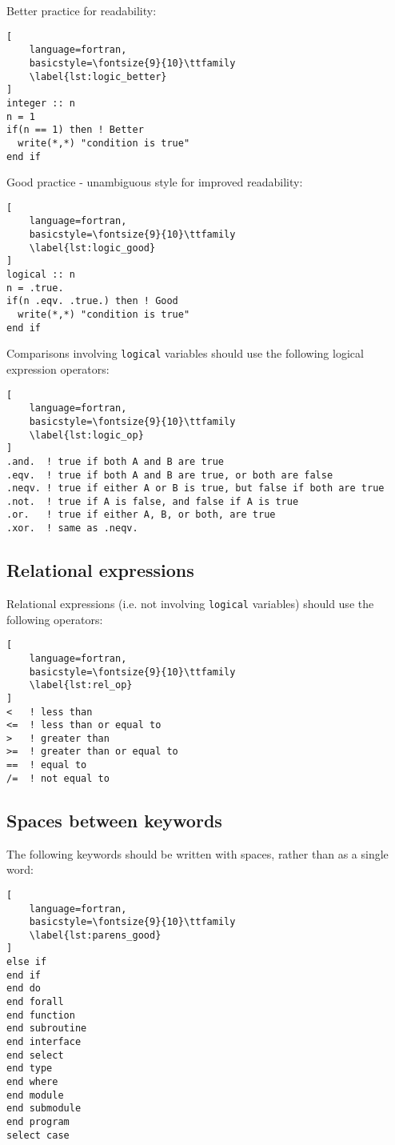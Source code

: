 \documentclass[11pt]{article}
\begin{document}
Better practice for readability:
\begin{lstlisting}[
	language=fortran,
    basicstyle=\fontsize{9}{10}\ttfamily
    \label{lst:logic_better}
]
integer :: n
n = 1
if(n == 1) then ! Better
  write(*,*) "condition is true"
end if
\end{lstlisting}

Good practice - unambiguous style for improved readability:

\begin{lstlisting}[
	language=fortran,
    basicstyle=\fontsize{9}{10}\ttfamily
    \label{lst:logic_good}
]
logical :: n
n = .true.
if(n .eqv. .true.) then ! Good
  write(*,*) "condition is true"
end if
\end{lstlisting}



Comparisons involving \texttt{logical} variables should use the 
following logical expression operators:
\begin{lstlisting}[
	language=fortran,
    basicstyle=\fontsize{9}{10}\ttfamily
    \label{lst:logic_op}
]
.and.  ! true if both A and B are true 
.eqv.  ! true if both A and B are true, or both are false
.neqv. ! true if either A or B is true, but false if both are true
.not.  ! true if A is false, and false if A is true
.or.   ! true if either A, B, or both, are true
.xor.  ! same as .neqv. 
\end{lstlisting}

\subsection{Relational expressions}
Relational expressions (i.e. not involving \texttt{logical} variables) should use the following operators:
\begin{lstlisting}[
	language=fortran,
    basicstyle=\fontsize{9}{10}\ttfamily
    \label{lst:rel_op}
]
<   ! less than
<=  ! less than or equal to
>   ! greater than
>=  ! greater than or equal to
==  ! equal to
/=  ! not equal to
\end{lstlisting}

\subsection{Spaces between keywords}
The following keywords should be written with spaces, rather than as a single word:
\begin{lstlisting}[
	language=fortran,
    basicstyle=\fontsize{9}{10}\ttfamily
    \label{lst:parens_good}
]
else if
end if
end do
end forall
end function
end subroutine
end interface
end select
end type
end where
end module
end submodule
end program
select case
\end{lstlisting}
\end{document}
